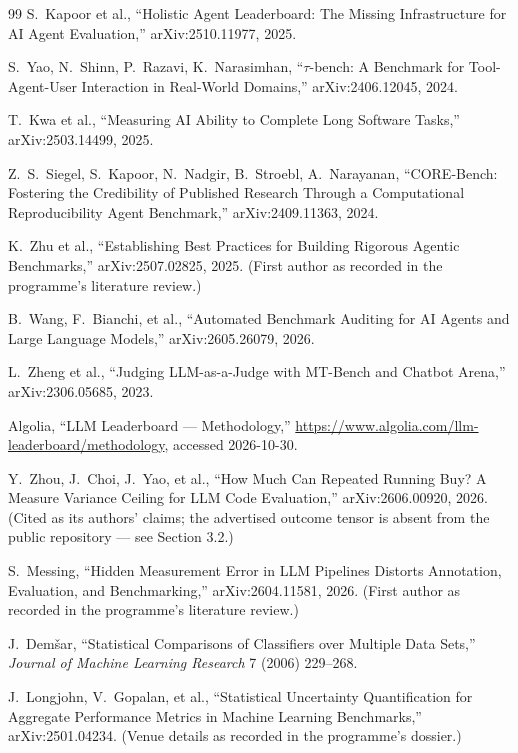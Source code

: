 \documentclass[11pt]{article}
\begin{document}
\begin{thebibliography}{99}
 S.~Kapoor et al., ``Holistic Agent
Leaderboard: The Missing Infrastructure for AI Agent Evaluation,''
arXiv:2510.11977, 2025.

 S.~Yao, N.~Shinn, P.~Razavi, K.~Narasimhan,
``$\tau$-bench: A Benchmark for Tool-Agent-User Interaction in
Real-World Domains,'' arXiv:2406.12045, 2024.

 T.~Kwa et al., ``Measuring AI Ability to Complete
Long Software Tasks,'' arXiv:2503.14499, 2025.

 Z.~S.~Siegel, S.~Kapoor, N.~Nadgir, B.~Stroebl,
A.~Narayanan, ``CORE-Bench: Fostering the Credibility of Published
Research Through a Computational Reproducibility Agent
Benchmark,'' arXiv:2409.11363, 2024.

 K.~Zhu et al., ``Establishing Best Practices for
Building Rigorous Agentic Benchmarks,'' arXiv:2507.02825, 2025.
(First author as recorded in the programme's literature review.)

 B.~Wang, F.~Bianchi, et al., ``Automated Benchmark
Auditing for AI Agents and Large Language Models,''
arXiv:2605.26079, 2026.

 L.~Zheng et al., ``Judging LLM-as-a-Judge with
MT-Bench and Chatbot Arena,'' arXiv:2306.05685, 2023.

 Algolia, ``LLM Leaderboard --- Methodology,''
\url{https://www.algolia.com/llm-leaderboard/methodology}, accessed
2026-10-30.

 Y.~Zhou, J.~Choi, J.~Yao, et al., ``How Much Can
Repeated Running Buy? A Measure Variance Ceiling for LLM Code
Evaluation,'' arXiv:2606.00920, 2026. (Cited as its authors' claims;
the advertised outcome tensor is absent from the public repository ---
see Section 3.2.)

 S.~Messing, ``Hidden Measurement Error in LLM
Pipelines Distorts Annotation, Evaluation, and Benchmarking,''
arXiv:2604.11581, 2026. (First author as recorded in the programme's
literature review.)

 J.~Dem\v{s}ar, ``Statistical Comparisons of
Classifiers over Multiple Data Sets,'' \emph{Journal of Machine
Learning Research} 7 (2006) 229--268.

 J.~Longjohn, V.~Gopalan, et al.,
``Statistical Uncertainty Quantification for Aggregate Performance
Metrics in Machine Learning Benchmarks,'' arXiv:2501.04234. (Venue
details as recorded in the programme's dossier.)

\end{thebibliography}
\end{document}
